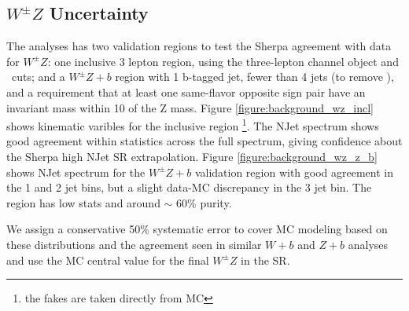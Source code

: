 \subsection{$W^{\pm}Z$ Uncertainty} 
The \tth analyses has two validation regions to test the Sherpa agreement with data for $W^{\pm}Z$: one inclusive 3 lepton region, using the three-lepton channel object and \pt\ cuts; and a $W^{\pm}Z+b$ region with 1 b-tagged jet, fewer than 4 jets (to remove \ttV), and a requirement that at least one same-flavor opposite sign pair have an invariant mass within 10 \gevcc of the Z mass. Figure \ref{figure:background_wz_incl} shows kinematic varibles for the inclusive region \footnote{the fakes are taken directly from MC}. The NJet spectrum shows good agreement within statistics across the full spectrum, giving confidence about the Sherpa high NJet SR extrapolation. Figure \ref{figure:background_wz_z_b} shows NJet spectrum for the $W^{\pm}Z+b$ validation region with good agreement in the 1 and 2 jet bins, but a slight data-MC discrepancy in the 3 jet bin. The region has low stats and around $\sim$ 60\% purity. 

We assign a conservative 50\% systematic error to cover MC modeling based on these distributions and the agreement seen in similar $W+b$ and $Z+b$ analyses and use the MC central value for the final $W^{\pm}Z$ in the SR. 

